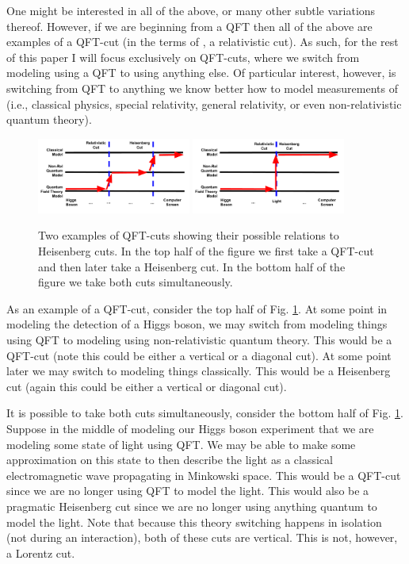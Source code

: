 \documentclass[12pt,prd,superscriptaddress,floatfix,amsmath,amssymb,amsfonts,nofootinbib]{revtex4-2}
\begin{document}
One might be interested in all of the above, or many other subtle variations thereof. However, if we are beginning from a QFT then all of the above are examples of a QFT-cut (in the terms of \cite{TaleOfTwo}, a relativistic cut). As such, for the rest of this paper I will focus exclusively on QFT-cuts, where we switch from modeling using a QFT to using anything else. Of particular interest, however, is switching from QFT to anything we know better how to model measurements of (i.e., classical physics, special relativity, general relativity, or even non-relativistic quantum theory).

\begin{figure}
\includegraphics[width=0.45\textwidth]{Figures/RelativisticCut.pdf}
\includegraphics[width=0.45\textwidth]{Figures/RelativisticCut2.pdf}
\caption{Two examples of QFT-cuts showing their possible relations to Heisenberg cuts. In the top half of the figure we first take a QFT-cut and then later take a Heisenberg cut. In the bottom half of the figure we take both cuts simultaneously.}\label{FigHiggs}
\end{figure}

As an example of a QFT-cut, consider the top half of Fig. \ref{FigHiggs}. At some point in modeling the detection of a Higgs boson, we may switch from modeling things using QFT to modeling using non-relativistic quantum theory. This would be a QFT-cut (note this could be either a vertical or a diagonal cut). At some point later we may switch to modeling things classically. This would be a Heisenberg cut (again this could be either a vertical or diagonal cut).

It is possible to take both cuts simultaneously, consider the bottom half of Fig. \ref{FigHiggs}. Suppose in the middle of modeling our Higgs boson experiment that we are modeling some state of light using QFT. We may be able to make some approximation on this state to then describe the light as a classical electromagnetic wave propagating in Minkowski space. This would be a QFT-cut since we are no longer using QFT to model the light. This would also be a pragmatic Heisenberg cut since we are no longer using anything quantum to model the light. Note that because this theory switching happens in isolation (not during an interaction), both of these cuts are vertical. This is not, however, a Lorentz cut.
\end{document}
